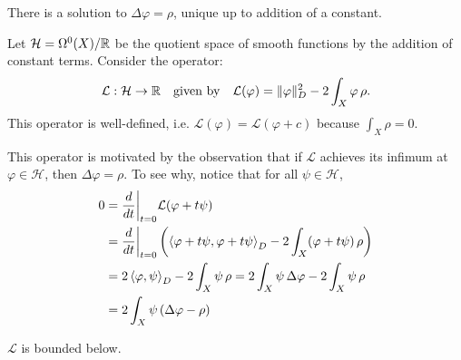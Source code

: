 \documentclass{lkx_paper}
\begin{document}
\begin{theorem}
	There is a solution to $\Delta \varphi = \rho$, unique up to addition of a constant.
\end{theorem}

Let $\mathcal{H} = \Omega^0(X) / \mathbb{R}$ be the quotient space of smooth functions by the addition of constant terms. Consider the operator:
\[
	\mathcal{L} : \mathcal{H} \to \mathbb{R}\quad\textrm{given by}\quad \mathcal{L}(\varphi) = \|\varphi\|^2_D - 2\int_X \varphi\, \rho.
\]
This operator is well-defined, i.e. $\mathcal{L}(\varphi) = \mathcal{L}(\varphi + c)$ because $\int_X \rho = 0$.

This operator is motivated by the observation that if $\mathcal{L}$ achieves its infimum at $\varphi\in \mathcal{H}$, then $\Delta \varphi = \rho$. To see why, notice that for all $\psi \in \mathcal{H}$,
\[
	\begin{aligned}
		0 & = \restr{\frac{d}{dt}}{t=0} \mathcal{L}(\varphi + t\psi)                                                                                \\
		  & = \restr{\frac{d}{dt}}{t=0} \left(\left\langle \varphi + t\psi, \varphi + t\psi\right\rangle_D - 2\int_X (\varphi + t\psi)\,\rho\right) \\
		  & = 2\left\langle \varphi, \psi\right\rangle_D - 2\int_X \psi\,\rho
		= 2\int_X \psi\, \Delta \varphi - 2\int_X \psi\,\rho                                                                                        \\
		  & = 2\int_X \psi\, (\Delta \varphi -\rho)
	\end{aligned}
\]

\begin{lemma}
	$\mathcal{L}$ is bounded below.
\end{lemma}
\end{document}
